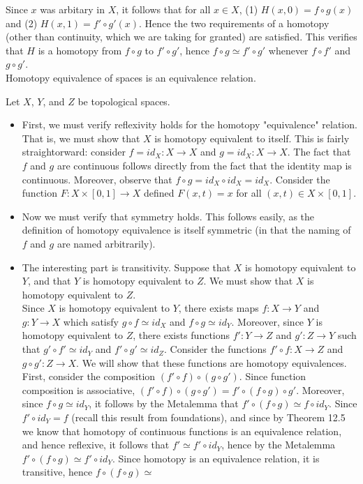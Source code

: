 \documentclass{article}
\begin{document}
Since $x$ was arbitary in $X$, it follows that for all $x\in X$, (1) $H(x,0) = f\circ g(x)$ and (2) $H(x,1) = f'\circ g'(x)$. Hence the two requirements of a homotopy (other than continuity, which we are taking for granted) are satisfied. This verifies that $H$ is a homotopy from $f\circ g$ to $f'\circ g'$, hence $f\circ g\simeq f'\circ g'$ whenever $f\circ f'$ and $g\circ g'$. 
\\


 Homotopy equivalence of spaces is an equivalence relation. 

 Let $X$, $Y$, and $Z$ be topological spaces.
\begin{itemize}
    \item First, we must verify reflexivity holds for the homotopy "equivalence" relation. That is, we must show that $X$ is homotopy equivalent to itself. This is fairly straightorward: consider $f = id_X : X\rightarrow X$ and $g = id_X: X \rightarrow X$. The fact that $f$ and $g$ are continuous follows directly from the fact that the identity map is continuous. Moreover, observe that $f\circ g = id_X\circ id_X = id_X$. Consider the function $F:X\times [0,1]\rightarrow X$ defined $F(x,t) = x$ for all $(x,t)\in X\times [0,1]$.  
    \item Now we must verify that symmetry holds. This follows easily, as the definition of homotopy equivalence is itself symmetric (in that the naming of $f$ and $g$ are named arbitrarily). 
    \item The interesting part is transitivity. Suppose that $X$ is homotopy equivalent to $Y$, and that $Y$ is homotopy equivalent to $Z$. We must show that $X$ is homotopy equivalent to $Z$. \\
    
    Since $X$ is homotopy equivalent to $Y$, there exists maps $f:X\rightarrow Y$ and $g:Y\rightarrow X$ which satisfy $g\circ f\simeq id_X$ and $f\circ g\simeq id_Y$. Moreover, since $Y$ is homotopy equivalent to $Z$, there exists functions $f':Y\rightarrow Z$ and $g':Z\rightarrow Y$ such that $g'\circ f' \simeq id_Y$ and $f'\circ g'\simeq id_Z$. Consider the functions $f'\circ f: X\rightarrow Z$ and $g\circ g':Z\rightarrow X$. We will show that these functions are homotopy equivalences.\\
    
    First, consider the composition $(f'\circ f)\circ (g\circ g')$. Since function composition is  associative, $(f'\circ f)\circ (g\circ g') = f'\circ(f\circ g)\circ g'$. Moreover, since $f\circ g\simeq id_Y$, it follows by the Metalemma that $f'\circ(f\circ g) \simeq f\circ id_Y$. Since $f'\circ id_Y = f$ (recall this result from foundations), and since by Theorem 12.5 we know that homotopy of continuous functions is an equivalence relation, and hence reflexive, it follows that $f'\simeq f'\circ id_Y$, hence by the Metalemma $f'\circ (f\circ g) \simeq f'\circ id_Y$. Since homotopy is an equivalence relation, it is transitive, hence $f\circ(f\circ g)\simeq $
\end{itemize}
\end{document}
